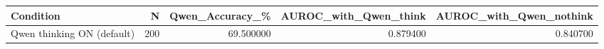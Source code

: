 \begin{tabular}{lrrrr}
\toprule
Condition & N & Qwen\_Accuracy\_\% & AUROC\_with\_Qwen\_think & AUROC\_with\_Qwen\_nothink \\
\midrule
Qwen thinking ON (default) & 200 & 69.500000 & 0.879400 & 0.840700 \\
\bottomrule
\end{tabular}
